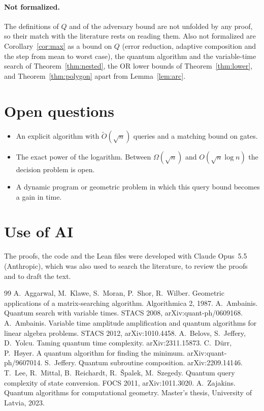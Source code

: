 \documentclass[11pt]{article}
\theoremstyle{definition}
\theoremstyle{remark}
\newcommand{\Ot}{\tilde O}
\begin{document}
\paragraph{Not formalized.} The definitions of $Q$ and of the adversary bound are not unfolded by any proof, so their match with the literature rests on reading them. Also not formalized are Corollary~\ref{cor:max} as a bound on $Q$ (error reduction, adaptive composition and the step from mean to worst case), the quantum algorithm and the variable-time search of Theorem~\ref{thm:nested}, the OR lower bounds of Theorem~\ref{thm:lower}, and Theorem~\ref{thm:polygon} apart from Lemma~\ref{lem:arc}.

\section{Open questions}

\begin{itemize}[leftmargin=1.5em]
\item An explicit algorithm with $\Ot(\sqrt n)$ queries and a matching bound on gates.
\item The exact power of the logarithm. Between $\Omega(\sqrt n)$ and $O(\sqrt n\log n)$ the decision problem is open.
\item A dynamic program or geometric problem in which this query bound becomes a gain in time.
\end{itemize}

\section*{Use of AI}

The proofs, the code and the Lean files were developed with Claude Opus~5.5 (Anthropic), which was also used to search the literature, to review the proofs and to draft the text.

\begin{thebibliography}{99}
 A.~Aggarwal, M.~Klawe, S.~Moran, P.~Shor, R.~Wilber. Geometric applications of a matrix-searching algorithm. Algorithmica 2, 1987.
 A.~Ambainis. Quantum search with variable times. STACS 2008, arXiv:quant-ph/0609168.
 A.~Ambainis. Variable time amplitude amplification and quantum algorithms for linear algebra problems. STACS 2012, arXiv:1010.4458.
 A.~Belovs, S.~Jeffery, D.~Yolcu. Taming quantum time complexity. arXiv:2311.15873.
 C.~D\"urr, P.~H\o yer. A quantum algorithm for finding the minimum. arXiv:quant-ph/9607014.
 S.~Jeffery. Quantum subroutine composition. arXiv:2209.14146.
 T.~Lee, R.~Mittal, B.~Reichardt, R.~\v{S}palek, M.~Szegedy. Quantum query complexity of state conversion. FOCS 2011, arXiv:1011.3020.
 A.~Zajakins. Quantum algorithms for computational geometry. Master's thesis, University of Latvia, 2023.
\end{thebibliography}
\end{document}
